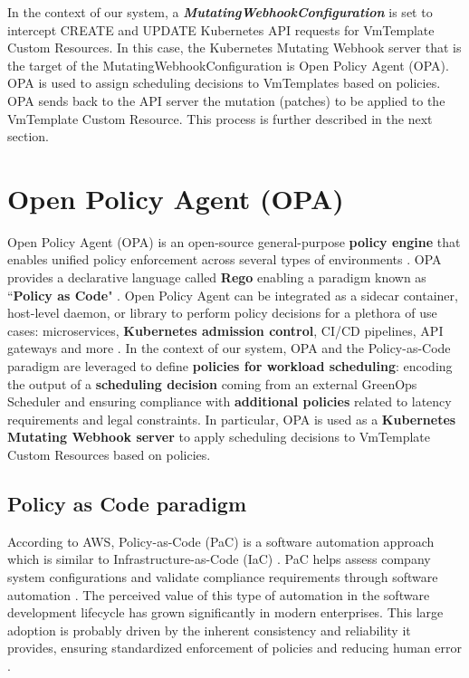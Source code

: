 In the context of our system, a \textbf{\textit{MutatingWebhookConfiguration}} is set to intercept CREATE and UPDATE Kubernetes API requests for VmTemplate Custom Resources.
In this case, the Kubernetes Mutating Webhook server that is the target of the MutatingWebhookConfiguration is Open Policy Agent (OPA).
OPA is used to assign scheduling decisions to VmTemplates based on policies. 
OPA sends back to the API server the mutation (patches) to be applied to the VmTemplate Custom Resource.
This process is further described in the next section.

\section{Open Policy Agent (OPA)}

Open Policy Agent (OPA) is an open-source general-purpose \textbf{policy engine} that enables unified policy enforcement across several types of environments \cite{opa_docs}. 
OPA provides a declarative language called \textbf{Rego} enabling a paradigm known as ``\textbf{Policy as Code}" \cite{opa_docs}.
Open Policy Agent can be integrated as a sidecar container, host-level daemon, or library to perform policy decisions for a plethora of use cases: microservices, \textbf{Kubernetes admission control}, CI/CD pipelines, API gateways and more \cite{opa_docs}. 
In the context of our system, OPA and the Policy-as-Code paradigm are leveraged to define \textbf{policies for workload scheduling}: encoding the output of a \textbf{scheduling decision} coming from an external GreenOps Scheduler and ensuring compliance with \textbf{additional policies} related to latency requirements and legal constraints.
In particular, OPA is used as a \textbf{Kubernetes Mutating Webhook server} to apply scheduling decisions to VmTemplate Custom Resources based on policies.

\subsection{Policy as Code paradigm}

According to AWS, Policy-as-Code (PaC) is a software automation approach which is similar to Infrastructure-as-Code (IaC) \cite{pac_aws}. PaC helps assess company system configurations and validate compliance requirements through software automation \cite{pac_aws}. The perceived value of this type of automation in the software development lifecycle has grown significantly in modern enterprises. This large adoption is probably driven by the inherent consistency and reliability it provides, ensuring standardized enforcement of policies and reducing human error \cite{pac_aws}.

